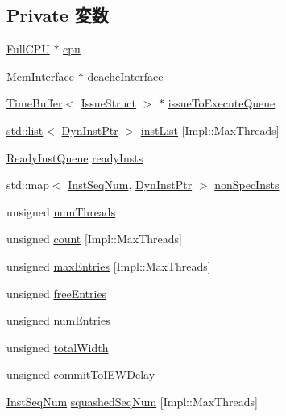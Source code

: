 \subsection*{Private 変数}
\begin{DoxyCompactItemize}
\item 
\hyperlink{classInstQueue_a90ba84e54618cc07f2e8f05e046cb5ce}{FullCPU} $\ast$ \hyperlink{classInstQueue_a766385c2941cd46525f4d9dff90200a2}{cpu}
\item 
MemInterface $\ast$ \hyperlink{classInstQueue_a22dc8294eecb144fbdd951d2e32e9330}{dcacheInterface}
\item 
\hyperlink{classTimeBuffer}{TimeBuffer}$<$ \hyperlink{structIssueStruct}{IssueStruct} $>$ $\ast$ \hyperlink{classInstQueue_af5c55240e63d9a13358eede4eb5352f1}{issueToExecuteQueue}
\item 
\hyperlink{classstd_1_1list}{std::list}$<$ \hyperlink{classInstQueue_a028ce10889c5f6450239d9e9a7347976}{DynInstPtr} $>$ \hyperlink{classInstQueue_a7f2828a4f877a4a4d4b85a6788536b82}{instList} \mbox{[}Impl::MaxThreads\mbox{]}
\item 
\hyperlink{classInstQueue_a60636ae8f3b649078c4f1bdd3b20dcad}{ReadyInstQueue} \hyperlink{classInstQueue_a73e22f052c708ca5c198bd0a01eb3604}{readyInsts}
\item 
std::map$<$ \hyperlink{inst__seq_8hh_a258d93d98edaedee089435c19ea2ea2e}{InstSeqNum}, \hyperlink{classInstQueue_a028ce10889c5f6450239d9e9a7347976}{DynInstPtr} $>$ \hyperlink{classInstQueue_ac0ba4d07026aaf6386c001a68d059cbf}{nonSpecInsts}
\item 
unsigned \hyperlink{classInstQueue_a792311f13ea91008a88e902ef13b0341}{numThreads}
\item 
unsigned \hyperlink{classInstQueue_ac638062ba1de6609f143c5ee3a601109}{count} \mbox{[}Impl::MaxThreads\mbox{]}
\item 
unsigned \hyperlink{classInstQueue_a51e5f9f0cb40d61e95b1518f1be90b73}{maxEntries} \mbox{[}Impl::MaxThreads\mbox{]}
\item 
unsigned \hyperlink{classInstQueue_ac2281ff630f82397bda33269f4ee8796}{freeEntries}
\item 
unsigned \hyperlink{classInstQueue_a325de474a9f6652329339d9fc2ea09c0}{numEntries}
\item 
unsigned \hyperlink{classInstQueue_ab3c3a8cd00248d9cd6acad330da902a7}{totalWidth}
\item 
unsigned \hyperlink{classInstQueue_a92c8d68d5f0e17758f89daa2647196f5}{commitToIEWDelay}
\item 
\hyperlink{inst__seq_8hh_a258d93d98edaedee089435c19ea2ea2e}{InstSeqNum} \hyperlink{classInstQueue_a97d5a7e4630ad1d017909f7504b9ec32}{squashedSeqNum} \mbox{[}Impl::MaxThreads\mbox{]}

\end{DoxyCompactItemize}
